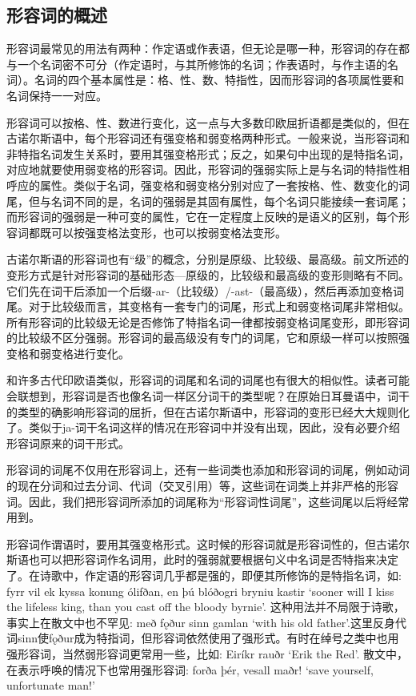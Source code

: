 \subsection{形容词的概述}\label{形容词的概述}

形容词最常见的用法有两种：作定语或作表语，但无论是哪一种，形容词的存在都与一个名词密不可分（作定语时，与其所修饰的名词；作表语时，与作主语的名词）。名词的四个基本属性是：格、性、数、特指性，因而形容词的各项属性要和名词保持一一对应。

形容词可以按格、性、数进行变化，这一点与大多数印欧屈折语都是类似的，但在古诺尔斯语中，每个形容词还有强变格和弱变格两种形式。一般来说，当形容词和非特指名词发生关系时，要用其强变格形式；反之，如果句中出现的是特指名词，对应地就要使用弱变格的形容词。因此，形容词的强弱实际上是与名词的特指性相呼应的属性。类似于名词，强变格和弱变格分别对应了一套按格、性、数变化的词尾，但与名词不同的是，名词的强弱是其固有属性，每个名词只能接续一套词尾；而形容词的强弱是一种可变的属性，它在一定程度上反映的是语义的区别，每个形容词都既可以按强变格法变形，也可以按弱变格法变形。

古诺尔斯语的形容词也有``级''的概念，分别是原级、比较级、最高级。前文所述的变形方式是针对形容词的基础形态---原级的，比较级和最高级的变形则略有不同。它们先在词干后添加一个后缀-ar-（比较级）/-ast-（最高级），然后再添加变格词尾。对于比较级而言，其变格有一套专门的词尾，形式上和弱变格词尾非常相似。所有形容词的比较级无论是否修饰了特指名词一律都按弱变格词尾变形，即形容词的比较级不区分强弱。形容词的最高级没有专门的词尾，它和原级一样可以按照强变格和弱变格进行变化。

和许多古代印欧语类似，形容词的词尾和名词的词尾也有很大的相似性。读者可能会联想到，形容词是否也像名词一样区分词干的类型呢？在原始日耳曼语中，词干的类型的确影响形容词的屈折，但在古诺尔斯语中，形容词的变形已经大大规则化了。类似于ja-词干名词这样的情况在形容词中并没有出现，因此，没有必要介绍形容词原来的词干形式。

形容词的词尾不仅用在形容词上，还有一些词类也添加和形容词的词尾，例如动词的现在分词和过去分词、代词（交叉引用）等，这些词在词类上并非严格的形容词。因此，我们把形容词所添加的词尾称为``形容词性词尾''，这些词尾以后将经常用到。

形容词作谓语时，要用其强变格形式。这时候的形容词就是形容词性的，但古诺尔斯语也可以把形容词作名词用，此时的强弱就要根据句义中名词是否特指来决定了。在诗歌中，作定语的形容词几乎都是强的，即便其所修饰的是特指名词，如:
fyrr vil ek kyssa konung ólifðan, en þú blóðogri bryniu kastir `sooner
will I kiss the lifeless king, than you cast off the bloody byrnie‌'.
这种用法并不局限于诗歌，事实上在散文中也不罕见: með fǫður sinn gamlan
`with his old
father‌'.这里反身代词sinn使fǫður成为特指词，但形容词依然使用了强形式。有时在绰号之类中也用强形容词，当然弱形容词更常用一些，比如:
Eiríkr rauðr `Erik the Red‌'. 散文中，在表示呼唤的情况下也常用强形容词:
forða þér, vesall maðr! `save yourself, unfortunate man!‌'

